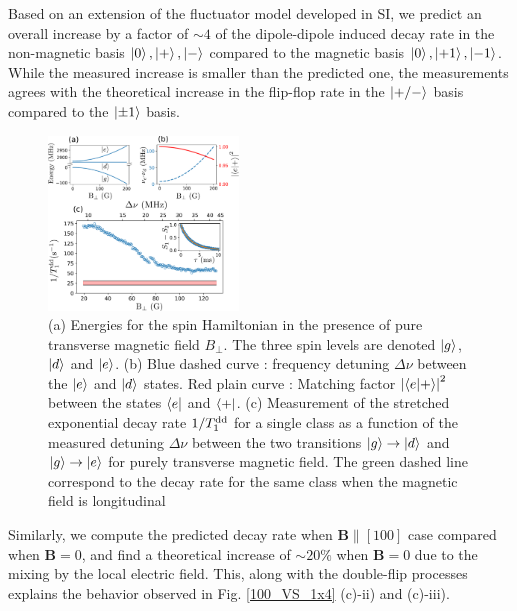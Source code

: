 \documentclass[preprintnumbers,amsmath,amssymb,superscriptaddress,twocolumn,showpacs]{revtex4-2}
\begin{document}
Based on an extension of the fluctuator model developed in SI, we predict an overall increase by a factor of $\sim 4$ of the dipole-dipole induced decay rate in the non-magnetic basis $\ket{0}, \ket{+}, \ket{-}$ compared to the magnetic basis $\ket{0}, \ket{+1}, \ket{-1}$. While the measured increase is smaller than the predicted one, the measurements agrees with the theoretical increase in the flip-flop rate in the $\ket{+/-}$ basis compared to the $\ket{\pm 1}$ basis.

\begin{figure}
\includegraphics[width=0.45\textwidth]{Figures/fig_transverse_field_V2.pdf}
\caption{(a) Energies for the spin Hamiltonian in the presence of pure transverse magnetic field $B_\perp$. The three spin levels are denoted $\ket{g}$, $\ket{d}$ and $\ket{e}$. (b) Blue dashed curve : frequency detuning $\Delta \nu$ between the $\ket{e}$ and $\ket{d}$ states. Red plain curve : Matching factor $\abs{\bra{e}\ket{+}}^2$ between the states $\bra{e}$ and $\bra{+}$. (c) Measurement of the stretched exponential decay rate $1/T_1^{\rm dd}$ for a single class as a function of the measured detuning $\Delta \nu$ between the two transitions $\ket{g} \to \ket {d}$ and  $\ket{g} \to \ket {e}$ for purely transverse magnetic field. The green dashed line correspond to the decay rate for the same class when the magnetic field is longitudinal}
\label{B_transverse}
\end{figure}
Similarly, we compute the predicted decay rate when $\bm B \parallel \left[100\right]$ case compared when $\bm B = 0$, and find a theoretical increase of $\sim 20\%$ when $\bm B = 0$ due to the mixing by the local electric field. This, along with the double-flip processes explains the behavior observed in Fig. \ref{100_VS_1x4} (c)-ii) and (c)-iii).
\end{document}
